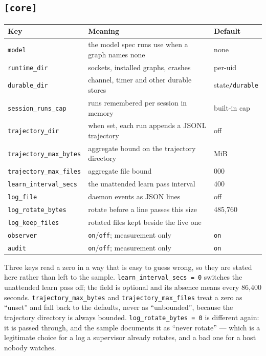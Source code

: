 \subsection*{\texttt{[core]}}

\begin{longtable}{@{}>{\raggedright\arraybackslash}p{}>{\raggedright\arraybackslash}p{}>{\raggedright\arraybackslash}p{}@{}}
  \toprule
  \textbf{Key} & \textbf{Meaning} & \textbf{Default} \\
  \midrule
  \endhead
  \texttt{model} & the model spec runs use when a graph names none & none \\
  \texttt{runtime\_dir} & sockets, installed graphs, crashes & per-uid \\
  \texttt{durable\_dir} & channel, timer and other durable stores & state\texttt{/durable} \\
  \texttt{session\_runs\_cap} & runs remembered per session in memory & built-in cap \\
  \texttt{trajectory\_dir} & when set, each run appends a JSONL trajectory & off \\
  \texttt{trajectory\_max\_bytes} & aggregate bound on the trajectory directory & 512 MiB \\
  \texttt{trajectory\_max\_files} & aggregate file bound & 50{,}000 \\
  \texttt{learn\_interval\_secs} & the unattended learn pass interval & 86{,}400 \\
  \texttt{log\_file} & daemon events as JSON lines & off \\
  \texttt{log\_rotate\_bytes} & rotate before a line passes this size & 10{,}485{,}760 \\
  \texttt{log\_keep\_files} & rotated files kept beside the live one & 5 \\
  \texttt{observer} & \texttt{on}/\texttt{off}; measurement only & \texttt{on} \\
  \texttt{audit} & \texttt{on}/\texttt{off}; measurement only & \texttt{on} \\
  \bottomrule
\end{longtable}

Three keys read a zero in a way that is easy to guess wrong, so they are stated here rather
than left to the sample. \texttt{learn\_interval\_secs = 0} switches the unattended learn
pass off; the field is optional and its absence means every 86{,}400 seconds.
\texttt{trajectory\_max\_bytes} and \texttt{trajectory\_max\_files} treat a zero as
\enquote{unset} and fall back to the defaults, never as \enquote{unbounded}, because the
trajectory directory is always bounded. \texttt{log\_rotate\_bytes = 0} is different again:
it is passed through, and the sample documents it as \enquote{never rotate} --- which is a
legitimate choice for a log a supervisor already rotates, and a bad one for a host nobody
watches.

